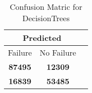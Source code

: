 \begin{table}[] 
\caption{Confusion Matric for DecisionTrees} 
\label{Table: Prediction Accuracy-DMDDecisionTreesOnlySunEKF-ignoreReflection-Reflection} 
\centering 
\begin{tabular} 
 {@{}ccc@{}} 
\toprule 
\multicolumn{2}{c}{\textbf{Predicted}}
 \\ \midrule 
\multicolumn{1}{|c|}{Failure} & 
\multicolumn{1}{c|}{No Failure}
 \\ \midrule 
\multicolumn{1}{|c|}{\color{green}\textbf{87495}} & 
\multicolumn{1}{c|}{\color{red}\textbf{12309}}
 \\ \midrule 
\multicolumn{1}{|c|}{\color{red}\textbf{16839}} & 
\multicolumn{1}{c|}{\color{green}\textbf{53485}}
 \\ \bottomrule 
\end{tabular} 
\end{table} 
